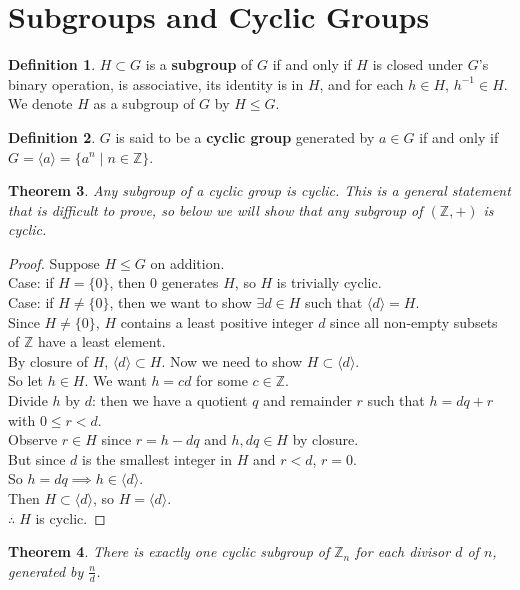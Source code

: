 \documentclass[11pt]{amsart}
\newtheorem{theorem}{Theorem}[section]
\theoremstyle{definition}
\newtheorem{definition}[theorem]{Definition}
\newcommand{\integers}{\mathbb{Z}}
\begin{document}
\section{Subgroups and Cyclic Groups}
\begin{definition}
	$H \subset G$ is a \textbf{subgroup} of $G$ if and only if $H$ is closed under $G$'s binary operation, is associative, its identity
	is in $H$, and for each $h \in H$, $h^{-1} \in H$. We denote $H$ as a subgroup of $G$ by $H \leq G$.
\end{definition}
\begin{definition}
	$G$ is said to be a \textbf{cyclic group} generated by $a \in G$ if and only if $G = \langle a \rangle = \{ a^n \; | \; n \in \integers \}$.
\end{definition}
\begin{theorem}
	Any subgroup of a cyclic group is cyclic. This is a general statement that is difficult to prove, so below we will show that
	any subgroup of $(\integers, +)$ is cyclic.
\end{theorem}
\begin{proof}
	Suppose $H \leq G$ on addition. \\
	Case: if $H = \{ 0 \}$, then 0 generates $H$, so $H$ is trivially cyclic. \\
	Case: if $H \neq \{ 0 \}$, then we want to show $\exists d \in H$ such that $\langle d \rangle = H$. \\
	Since $H \neq \{ 0 \}$, $H$ contains a least positive integer $d$ since all non-empty subsets of $\integers$ have a
	least element. \\
	By closure of $H$, $\langle d \rangle \subset H$. Now we need to show $H \subset \langle d \rangle$. \\
	So let $h \in H$. We want $h = cd$ for some $c \in \integers$. \\
	Divide $h$ by $d$: then we have a quotient $q$ and remainder $r$ such that $h = dq + r$ with $0 \leq r < d$. \\
	Observe $r \in H$ since $r = h - dq$ and $h, dq \in H$ by closure. \\
	But since $d$ is the smallest integer in $H$ and $r < d$, $r = 0$. \\
	So $h = dq \implies h \in \langle d \rangle$. \\
	Then $H \subset \langle d \rangle$, so $H = \langle d \rangle$. \\
	$\therefore \; H$ is cyclic.
\end{proof}
\begin{theorem}
	There is exactly one cyclic subgroup of $\integers_n$ for each divisor $d$ of $n$, generated by $\frac{n}{d}$.
\end{theorem}
\end{document}
